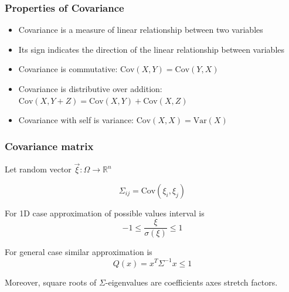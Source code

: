 \documentclass[fullscreen=true, bookmarks=true, hyperref={pdfencoding=unicode}]{beamer}
\begin{document}
\begin{frame}
  \frametitle{Properties of Covariance}
  \begin{itemize}
    \item Covariance is a measure of linear relationship between two variables
    \item Its sign indicates the direction of the linear relationship between variables
    \item Covariance is commutative: $\text{Cov}(X, Y) = \text{Cov}(Y, X)$
    \item Covariance is distributive over addition: $\text{Cov}(X, Y+Z) = \text{Cov}(X, Y) + \text{Cov}(X, Z)$
    \item Covariance with self is variance: $\text{Cov}(X, X) = \text{Var}(X)$
  \end{itemize}
\end{frame}

\begin{frame}
  \frametitle{Covariance matrix}
  Let random vector $\vec{\xi}:\Omega \to \mathbb{R}^n$

  \begin{definition}
    $$\Sigma_{ij} = \text{Cov}(\xi_i, \xi_j)$$
  \end{definition}

  For 1D case approximation of possible values interval is $$-1 \leq \frac{\xi}{\sigma(\xi)}\leq 1$$

  For general case similar approximation is
  $$ Q(x) = x^T \Sigma^{-1} x \leq 1$$

  Moreover, square roots of $\Sigma$-eigenvalues are coefficients axes stretch factors.

\end{frame}
\end{document}
